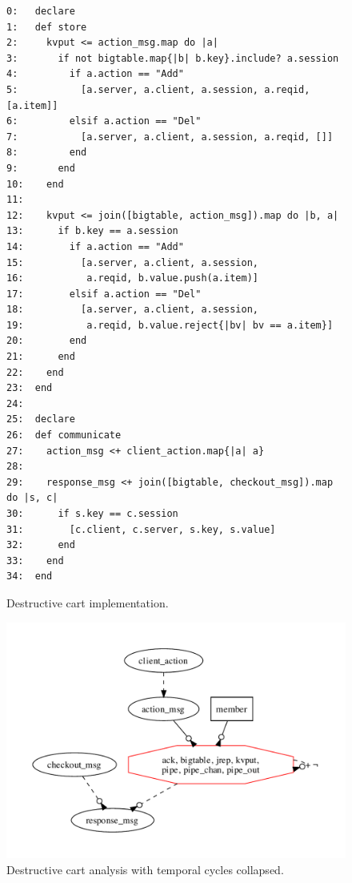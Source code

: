 \begin{figure}[t]
\begin{scriptsize}
\begin{verbatim}
0:   declare
1:   def store
2:     kvput <= action_msg.map do |a|
3:       if not bigtable.map{|b| b.key}.include? a.session
4:         if a.action == "Add"
5:           [a.server, a.client, a.session, a.reqid, [a.item]]
6:         elsif a.action == "Del"
7:           [a.server, a.client, a.session, a.reqid, []]
8:         end
9:       end
10:    end  
11:
12:    kvput <= join([bigtable, action_msg]).map do |b, a|
13:      if b.key == a.session
14:        if a.action == "Add"
15:          [a.server, a.client, a.session, 
16:           a.reqid, b.value.push(a.item)]
17:        elsif a.action == "Del"
18:          [a.server, a.client, a.session, 
19:           a.reqid, b.value.reject{|bv| bv == a.item}]
20:        end
21:      end
22:    end
23:  end
24:
25:  declare
26:  def communicate
27:    action_msg <+ client_action.map{|a| a}
28:
29:    response_msg <+ join([bigtable, checkout_msg]).map do |s, c|
30:      if s.key == c.session
31:        [c.client, c.server, s.key, s.value]
32:      end
33:    end
34:  end
\end{verbatim}
\vspace{-10pt}
\caption{Destructive cart implementation.}
\label{fig:pdg-destructive}
\vspace{-2pt}
\end{scriptsize}
\end{figure}

\begin{figure}[t]
\centering
\includegraphics[width=0.9\linewidth]{fig/destructive.pdf}
\vspace{-10pt}
\caption{Destructive cart analysis with temporal cycles collapsed.}
\label{fig:pdg-destructive-analysis}
\vspace{-2pt}
\end{figure}


